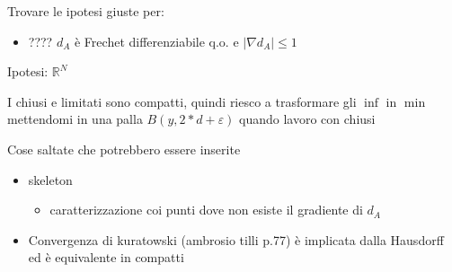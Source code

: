 \documentclass[a4paper,10pt]{article}
\theoremstyle{plain}
\theoremstyle{definition}
\theoremstyle{remark}
\newcommand{\abs}[1]{\left|#1\right|}
\begin{document}
\newpage

Trovare le ipotesi giuste per:
\begin{itemize}
\item ???? $d_A$ è Frechet differenziabile q.o. e $\abs{\nabla d_A}
  \le 1$
\end{itemize}


\newpage
Ipotesi: $\mathbb{R}^N$

I chiusi e limitati sono compatti, quindi riesco a trasformare gli
$\inf$ in $\min$ mettendomi in una palla $B(y,2*d+\varepsilon)$ quando
lavoro con chiusi


\newpage
Cose saltate che potrebbero essere inserite
\begin{itemize}
\item skeleton
  \begin{itemize}
  \item caratterizzazione coi punti dove non esiste il gradiente di
    $d_A$
  \end{itemize}
\item Convergenza di kuratowski (ambrosio tilli p.77) è implicata
  dalla Hausdorff ed è equivalente in compatti
\end{itemize}
\end{document}
